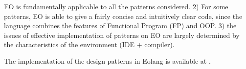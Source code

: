 \documentclass[sigplan,12pt,nonacm=true,review=false]{acmart}
\begin{document}
EO is fundamentally applicable to all the patterns considered. 2) For some patterns, EO is able to give a fairly concise and intuitively clear code, since the language combines the features of Functional Program (FP) and OOP. 3) the issues of effective implementation of patterns on EO are largely determined by the characteristics of the environment (IDE + compiler).

The implementation of the design patterns in Eolang is available at \cite{1093892.2389691/8768226502}.



\raggedright

\clearpage
\end{document}
